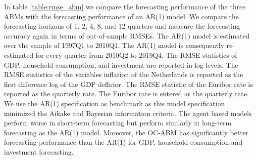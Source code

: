 In table \ref{table:rmse_abm} we compare the forecasting performance of the three ABMs with the forecasting performance of an AR(1) model. We compare the forecasting horizons of 1, 2, 4, 8, and 12 quarters and measure the forecasting accuracy again in terms of out-of-sample RMSEs. The AR(1) model is estimated over the sample of 1997Q1 to 2010Q1. The AR(1) model is consequently re-estimated for every quarter from 2010Q2 to 2019Q4. The RMSE statistics of GDP, household consumption, and investment are reported in log levels. The RMSE statistics of the variables inflation of the Netherlands is reported as the first difference log of the GDP deflator. The RMSE statistic of the Euribor rate is reported as the quarterly rate. The Euribor rate is entered as the quarterly rate. We use the AR(1) specification as benchmark as this model specification minimized the Aikake and Bayesian information criteria. The agent based models perform worse in short-term forecasting but perform similarly in long-term forecasting as the AR(1) model. Moreover, the OC-ABM  has significantly better forecasting performance than the AR(1) for GDP, household consumption and investment forecasting.\\
